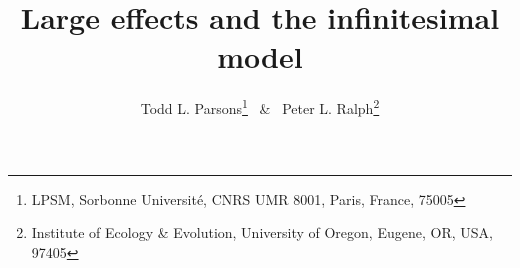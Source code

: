 \documentclass{article}
\newcommand{\1}{\mathbbm{1}}
\theoremstyle{remark}
\theoremstyle{definition}
\begin{document}
% 
% 
% 
% 
% 


\title{\large{\bf
    Large effects and the infinitesimal model
}}

\author{ \begin{small}
    Todd L. Parsons\footnote{LPSM, Sorbonne Universit\'e, CNRS UMR 8001, Paris, France, 75005}
    ~\&~
    Peter L. Ralph\footnote{Institute of Ecology \& Evolution, University of Oregon, Eugene, OR, USA, 97405}
\end{small}}
\end{document}

